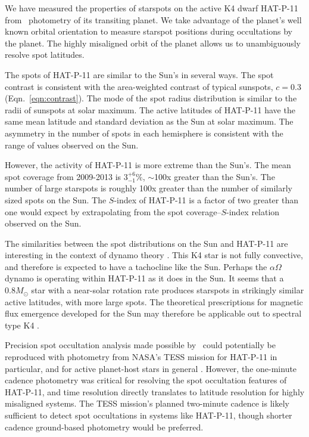 We have measured the properties of starspots on the active K4 dwarf HAT-P-11 from \kepler\ photometry of its transiting planet. We take advantage of the planet's well known orbital orientation to measure starspot positions during occultations by the planet. The highly misaligned orbit of the planet allows us to unambiguously resolve spot latitudes.

The spots of HAT-P-11 are similar to the Sun's in several ways. The spot contrast is consistent with the area-weighted contrast of typical sunspots, $c=0.3$ (Eqn.~\ref{eqn:contrast}). The mode of the spot radius distribution is similar to the radii of sunspots at solar maximum. The active latitudes of HAT-P-11 have the same mean latitude and standard deviation as the Sun at solar maximum. The asymmetry in the number of spots in each hemisphere is consistent with the range of values observed on the Sun. 

However, the activity of HAT-P-11 is more extreme than the Sun's. The mean spot coverage from 2009-2013 is $3^{+6}_{-1}\%$, $\sim$100x greater than the Sun's. The number of large starspots is roughly 100x greater than the number of similarly sized spots on the Sun. The $S$-index of HAT-P-11 is a factor of two greater than one would expect by extrapolating from the spot coverage--$S$-index relation observed on the Sun.

The similarities between the spot distributions on the Sun and HAT-P-11 are interesting in the context of dynamo theory \citep[e.g.][]{Charbonneau2010}. This K4 star is not fully convective, and therefore is expected to have a tachocline like the Sun. Perhaps the $\alpha\Omega$ dynamo is operating within HAT-P-11 as it does in the Sun. It seems that a $0.8M_\odot$ star with a near-solar rotation rate produces starspots in strikingly similar active latitudes, with more large spots. The theoretical prescriptions for magnetic flux emergence developed for the Sun may therefore be applicable out to spectral type K4 \citep[e.g.][]{Cheung2014}.

Precision spot occultation analysis made possible by \kepler\ could potentially be reproduced with photometry from NASA's TESS mission for HAT-P-11 in particular, and for active planet-host stars in general \citep{Ricker2014}. However, the one-minute cadence photometry was critical for resolving the spot occultation features of HAT-P-11, and time resolution directly translates to latitude resolution for highly misaligned systems. The TESS mission's planned two-minute cadence is likely sufficient to detect spot occultations in systems like HAT-P-11, though shorter cadence ground-based photometry would be preferred.


